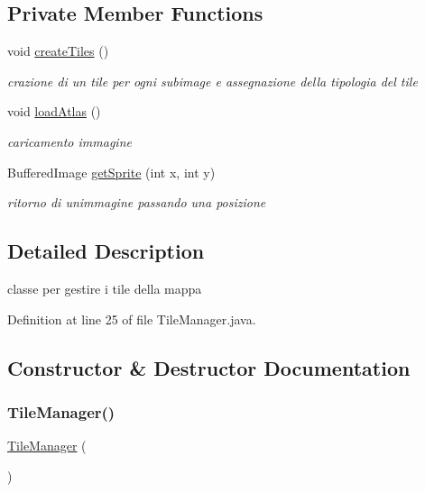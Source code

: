 \subsection*{Private Member Functions}
\begin{DoxyCompactItemize}
\item 
void \hyperlink{classmanagers_1_1_tile_manager_abb7fa074b36e6e355db16761115fb367}{create\+Tiles} ()
\begin{DoxyCompactList}\small\item\em crazione di un tile per ogni subimage e assegnazione della tipologia del tile \end{DoxyCompactList}\item 
void \hyperlink{classmanagers_1_1_tile_manager_afc6b9f4a25216ec36baa6e7518a7501a}{load\+Atlas} ()
\begin{DoxyCompactList}\small\item\em caricamento immagine \end{DoxyCompactList}\item 
Buffered\+Image \hyperlink{classmanagers_1_1_tile_manager_a96613c34a7cfb5341cc3c6a4fe3612a1}{get\+Sprite} (int x, int y)
\begin{DoxyCompactList}\small\item\em ritorno di un\textquotesingle{}immagine passando una posizione \end{DoxyCompactList}\end{DoxyCompactItemize}


\subsection{Detailed Description}
classe per gestire i tile della mappa 

Definition at line 25 of file Tile\+Manager.\+java.



\subsection{Constructor \& Destructor Documentation}
\mbox{\label{classmanagers_1_1_tile_manager_a041c1b12a4eb5574dfedf0af6393c014}} 
\subsubsection{\texorpdfstring{Tile\+Manager()}{TileManager()}}
{\footnotesize\ttfamily \hyperlink{classmanagers_1_1_tile_manager}{Tile\+Manager} (\begin{DoxyParamCaption}{ }\end{DoxyParamCaption})}



